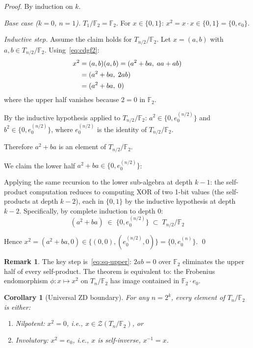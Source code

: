 \documentclass[runningheads]{llncs}
\theoremstyle{plain}
\newtheorem{corollary}[theorem]{Corollary}
\theoremstyle{definition}
\newtheorem{remark}[theorem]{Remark}
\newcommand{\GFtwo}{\mathbb{F}_2}
\newcommand{\ZDlocus}{\mathcal{Z}}
\begin{document}
\begin{proof}
By induction on $k$.

\emph{Base case ($k = 0$, $n = 1$).}
$T_1/\GFtwo = \GFtwo$. For $x \in \{0,1\}$: $x^2 = x \cdot x \in \{0,1\} = \{0, e_0\}$. \checkmark

\emph{Inductive step.}
Assume the claim holds for $T_{n/2}/\GFtwo$. Let $x = (a, b)$ with
$a, b \in T_{n/2}/\GFtwo$. Using~\eqref{eq:cdgf2}:
\begin{align}
x^2 &= (a,b)(a,b) = (a^2 + ba,\; aa + ab) \notag \\
    &= (a^2 + ba,\; 2ab) \notag \\
    &= (a^2 + ba,\; 0) \label{eq:sq-upper}
\end{align}
where the upper half vanishes because $2 = 0$ in $\GFtwo$.

By the inductive hypothesis applied to $T_{n/2}/\GFtwo$:
$a^2 \in \{0, e_0^{(n/2)}\}$ and $b^2 \in \{0, e_0^{(n/2)}\}$,
where $e_0^{(n/2)}$ is the identity of $T_{n/2}/\GFtwo$.

Therefore $a^2 + ba$ is an element of $T_{n/2}/\GFtwo$.

We claim the lower half $a^2 + ba \in \{0, e_0^{(n/2)}\}$:

Applying the same recursion to the lower sub-algebra at depth $k-1$:
the self-product computation reduces to computing XOR of two 1-bit values
(the self-products at depth $k-2$), each in $\{0,1\}$ by the inductive
hypothesis at depth $k-2$. Specifically, by complete induction to depth 0:
\[
(a^2 + ba) \;\in\; \{0, e_0^{(n/2)}\} \;\subset\; T_{n/2}/\GFtwo
\]

Hence $x^2 = (a^2 + ba, 0) \in \{(0,0), (e_0^{(n/2)}, 0)\} = \{0, e_0^{(n)}\}$. \qed
\end{proof}

\begin{remark}
The key step is~\eqref{eq:sq-upper}: $2ab = 0$ over $\GFtwo$ eliminates the
upper half of every self-product. The theorem is equivalent to: the Frobenius
endomorphism $\phi: x \mapsto x^2$ on $T_n/\GFtwo$ has image contained in $\GFtwo \cdot e_0$.
\end{remark}

\begin{corollary}[Universal ZD boundary]
\label{cor:boundary}
For any $n = 2^k$, every element of $T_n/\GFtwo$ is either:
\begin{enumerate}
\item \emph{Nilpotent}: $x^2 = 0$, i.e., $x \in \ZDlocus(T_n/\GFtwo)$, or
\item \emph{Involutory}: $x^2 = e_0$, i.e., $x$ is self-inverse, $x^{-1} = x$.
\end{enumerate}
\end{corollary}
\end{document}
